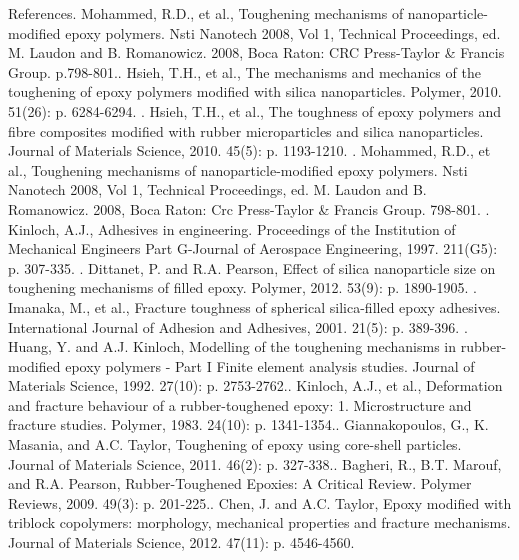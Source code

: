 \documentclass[numbers=noendperiod,chapterprefix=on]{icldt} %
\begin{document}
References.	Mohammed, R.D., et al., Toughening mechanisms of nanoparticle-modified epoxy polymers. Nsti Nanotech 2008, Vol 1, Technical Proceedings, ed. M. Laudon and B. Romanowicz. 2008, Boca Raton: CRC Press-Taylor \& Francis Group. p.798-801..	Hsieh, T.H., et al., The mechanisms and mechanics of the toughening of epoxy polymers modified with silica nanoparticles. Polymer, 2010. 51(26): p. 6284-6294.
.	Hsieh, T.H., et al., The toughness of epoxy polymers and fibre composites modified with rubber microparticles and silica nanoparticles. Journal of Materials Science, 2010. 45(5): p. 1193-1210.
.	Mohammed, R.D., et al., Toughening mechanisms of nanoparticle-modified epoxy polymers. Nsti Nanotech 2008, Vol 1, Technical Proceedings, ed. M. Laudon and B. Romanowicz. 2008, Boca Raton: Crc Press-Taylor \& Francis Group. 798-801.
.	Kinloch, A.J., Adhesives in engineering. Proceedings of the Institution of Mechanical Engineers Part G-Journal of Aerospace Engineering, 1997. 211(G5): p. 307-335.
.	Dittanet, P. and R.A. Pearson, Effect of silica nanoparticle size on toughening mechanisms of filled epoxy. Polymer, 2012. 53(9): p. 1890-1905.
.	Imanaka, M., et al., Fracture toughness of spherical silica-filled epoxy adhesives. International Journal of Adhesion and Adhesives, 2001. 21(5): p. 389-396.
.	Huang, Y. and A.J. Kinloch, Modelling of the toughening mechanisms in rubber-modified epoxy polymers - Part I Finite element analysis studies. Journal of Materials Science, 1992. 27(10): p. 2753-2762..	Kinloch, A.J., et al., Deformation and fracture behaviour of a rubber-toughened epoxy: 1. Microstructure and fracture studies. Polymer, 1983. 24(10): p. 1341-1354..	Giannakopoulos, G., K. Masania, and A.C. Taylor, Toughening of epoxy using core-shell particles. Journal of Materials Science, 2011. 46(2): p. 327-338..	Bagheri, R., B.T. Marouf, and R.A. Pearson, Rubber-Toughened Epoxies: A Critical Review. Polymer Reviews, 2009. 49(3): p. 201-225..	Chen, J. and A.C. Taylor, Epoxy modified with triblock copolymers: morphology, mechanical properties and fracture mechanisms. Journal of Materials Science, 2012. 47(11): p. 4546-4560.
\end{document}
